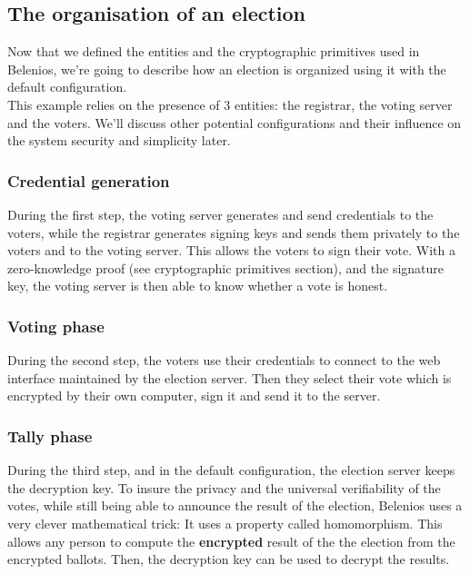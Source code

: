 \documentclass[12pt, a4paper]{report}
\begin{document}
\subsection{The organisation of an election}

Now that we defined the entities and the cryptographic primitives used in Belenios, we're going to describe how an election is organized using it with the default configuration.\\

This example relies on the presence of 3 entities: the registrar, the voting server and the voters. We'll discuss other potential configurations and their influence on the system security and simplicity later.

\subsubsection{Credential generation}

During the first step, the voting server generates and send credentials to the voters, while the registrar generates signing keys and sends them privately to the voters and to the voting server. This allows the voters to sign their vote. With a zero-knowledge proof (see cryptographic primitives section), and the signature key, the voting server is then able to know whether a  vote is honest.  

\subsubsection{Voting phase}

During the second step, the voters use their credentials to connect to the web interface maintained by the election server. Then they select their vote which is encrypted by their own computer, sign it and send it to the server. 

\subsubsection{Tally phase}

During the third step, and in the default configuration, the election server keeps the decryption key. To insure the privacy and the universal verifiability of the votes, while still being able to announce the result of the election, Belenios uses a very clever mathematical trick: It uses a property called homomorphism. This allows any person to compute the \textbf{encrypted} result of the the election from the encrypted ballots. Then, the decryption key can be used to decrypt the results.
 
\end{document}
